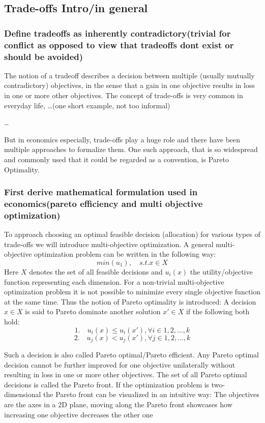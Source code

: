 \subsection{Trade-offs Intro/in general}
	\subsubsection{Define tradeoffs as  inherently contradictory(trivial for conflict as opposed to view that tradeoffs dont exist or should be avoided)}


	The notion of a tradeoff describes a decision between multiple (usually mutually contradictory) objectives, in the sense that a gain in one objective results in loss in one or more other objectives.
	The concept of trade-offs is very common in everyday life, \dots (one short example, not too informal)

	\dots
	
	But in economics especially, trade-offs play a huge role and there have been multiple approaches to formalize them.
	One such approach, that is so widespread and commonly used that it could be regarded as a convention, is Pareto Optimality.

	\subsubsection{First derive mathematical formulation used in economics(pareto efficiency and multi objective optimization)}

	To approach choosing an optimal feasible decision (allocation) for various types of trade-offs we will introduce multi-objective optimization.
	A general multi-objective optimization problem can be written in the following way:
	$$min(u_1), \quad s.t. x\in X$$
	Here $X$ denotes the set of all feasible decisions and $u_i(x)$ the utility/objective function representing each dimension.
	For a non-trivial multi-objective optimization problem it is not possible to minimize every single objective function at the same time.
	Thus the notion of Pareto optimality is introduced:
	A decision $x\in X$ is said to Pareto dominate another solution $x'\in X$ if the following both hold:
	$$1.\quad u_i(x)\le u_i(x'), \forall i\in {1,2,\dots,k}$$
	$$2. \quad u_j(x) < u_j(x'), \forall j\in {1,2,\dots,k}$$

	Such a decision is also called Pareto optimal/Pareto efficient.
	Any Pareto optimal decision cannot be further improved for one objective unilaterally without resulting in loss in one or more other objectives.
	The set of all Pareto optimal decisions is called the Pareto front.
	If the optimization problem is two-dimensional the Pareto front can be visualized in an intuitive way:
	The objectives are the axes in a 2D plane, moving along the Pareto front showcases how increasing one objective decreases the other one

